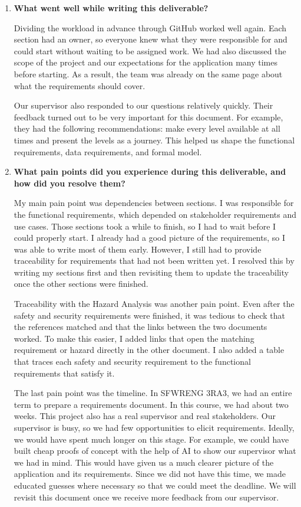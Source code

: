 \documentclass[12pt]{article}
\begin{document}
\begin{enumerate}

    \item \textbf{What went well while writing this deliverable?}

    Dividing the workload in advance through GitHub worked well again.
    Each section had an owner, so everyone knew what they were
    responsible for and could start without waiting to be assigned
    work. We had also discussed the scope of the project and our
    expectations for the application many times before starting.
    As a result, the team was already on the same page about what
    the requirements should cover.

    Our supervisor also responded to our questions relatively quickly. Their
    feedback turned out to be very important for this document. For
    example, they had the following recommendations: make every level available at
    all times and present the levels as a journey. This helped us shape the
    functional requirements, data requirements, and formal
    model.

    \item \textbf{What pain points did you experience during this
    deliverable, and how did you resolve them?}

    My main pain point was dependencies between sections. I was
    responsible for the functional requirements, which depended on
    stakeholder requirements and use cases. Those sections took
    a while to finish, so I had to wait before I could properly start.
    I already had a good picture of the requirements, so I was able
    to write most of them early. However, I still had to provide
    traceability for requirements that had not been written yet. 
    I resolved this by writing my sections first and
    then revisiting them to update the traceability once the other
    sections were finished.

    Traceability with the Hazard Analysis was another pain point.
    Even after the safety and security requirements were finished,
    it was tedious to check that the references matched and that the
    links between the two documents worked. To make this easier, I
    added links that open the matching requirement or hazard directly
    in the other document. I also added a table that traces each
    safety and security requirement to the functional requirements
    that satisfy it.

    The last pain point was the timeline. In SFWRENG 3RA3, we had an
    entire term to prepare a requirements document. In this course,
    we had about two weeks. This project also has a real supervisor
    and real stakeholders. Our supervisor is busy, so we had few
    opportunities to elicit requirements. Ideally, we would have
    spent much longer on this stage. For example, we could have built
    cheap proofs of concept with the help of AI to show our supervisor
    what we had in mind. This would have given us a much clearer
    picture of the application and its requirements. Since we did not
    have this time, we made educated guesses where necessary so that
    we could meet the deadline. We will revisit this document once we
    receive more feedback from our supervisor.


\end{enumerate}
\end{document}
